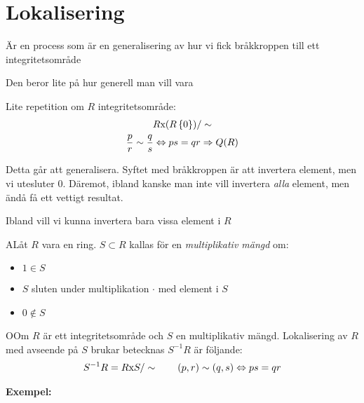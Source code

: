 \section{Lokalisering}\par
\noindent Är en process som är en generalisering av hur vi fick bråkkroppen till ett integritetsområde\par
\noindent Den beror lite på hur generell man vill vara
\par\bigskip
\noindent Lite repetition om $R$ integritetsområde:
\begin{equation*}
  \begin{gathered}
  R\text{x}(R\left\{0\right\})/\sim\\
  \dfrac{p}{r}\sim \dfrac{q}{s}\Leftrightarrow ps=qr\Rightarrow Q(R)
  \end{gathered}
\end{equation*}
\par\bigskip
\noindent Detta går att generalisera. Syftet med bråkkroppen är att invertera element, men vi utesluter 0. Däremot, ibland kanske man inte vill invertera \textit{alla} element, men ändå få ett vettigt resultat.\par
\noindent Ibland vill vi kunna invertera bara vissa element i $R$
\par\bigskip
\begin{theo}
  ALåt $R$ vara en ring. $S\subset R$ kallas för en \textit{multiplikativ mängd} om:\par
  \begin{itemize}
    \item $1\in S$
    \item $S$ sluten under multiplikation $\cdot$ med element i $S$
  \item $0\notin S$
  \end{itemize}
\end{theo}
\par\bigskip
\begin{theo}
  OOm $R$ är ett integritetsområde och $S$ en multiplikativ mängd. Lokalisering av $R$ med avseende på $S$ brukar betecknas $S^{-1}R$ är följande:
  \begin{equation*}
    \begin{gathered}
      S^{-1}R=R\text{x}S/\sim\qquad(p,r)\sim(q,s)\Leftrightarrow ps=qr
    \end{gathered}
  \end{equation*}
\end{theo}
\par\bigskip
\noindent\textbf{Exempel:}\par
